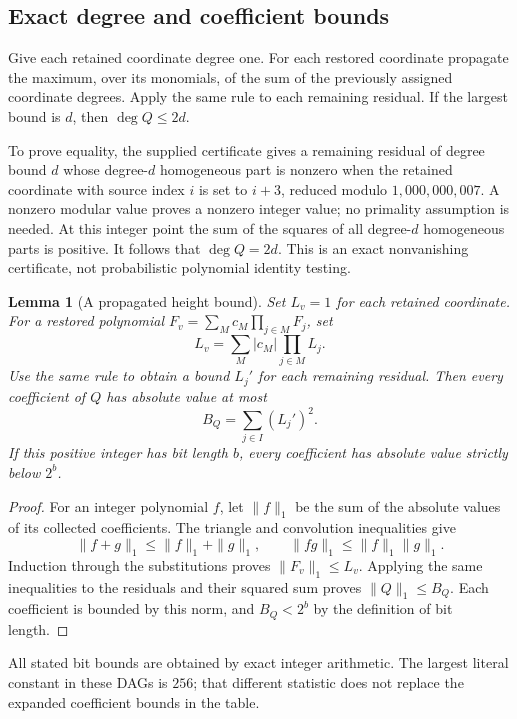\documentclass[11pt,letterpaper]{article}
\newtheorem{lemma}[theorem]{Lemma}
\theoremstyle{definition}
\theoremstyle{remark}
\begin{document}
\subsection{Exact degree and coefficient bounds}

Give each retained coordinate degree one.  For each restored coordinate
propagate the maximum, over its monomials, of the sum of the previously
assigned coordinate degrees.  Apply the same rule to each remaining
residual.  If the largest bound is $d$, then $\deg Q\le2d$.

To prove equality, the supplied certificate gives a remaining residual
of degree bound $d$ whose degree-$d$ homogeneous part is nonzero when
the retained coordinate with source index $i$ is set to $i+3$, reduced
modulo $1{,}000{,}000{,}007$.  A nonzero modular value proves a nonzero
integer value; no primality assumption is needed.  At this integer point
the sum of the squares of all degree-$d$ homogeneous parts is positive.
It follows that $\deg Q=2d$.  This is an exact nonvanishing certificate,
not probabilistic polynomial identity testing.

\begin{lemma}[A propagated height bound]
\label{lem:monic-height}
Set $L_v=1$ for each retained coordinate.  For a restored polynomial
$F_v=\sum_M c_M\prod_{j\in M}F_j$, set
\[
 L_v=\sum_M |c_M|\prod_{j\in M}L_j.
\]
Use the same rule to obtain a bound $L_j'$ for each remaining residual.
Then every coefficient of $Q$ has absolute value at most
\[
 B_Q=\sum_{j\in I}(L_j')^2.
\]
If this positive integer has bit length $b$, every coefficient has
absolute value strictly below $2^b$.
\end{lemma}

\begin{proof}
For an integer polynomial $f$, let $\|f\|_1$ be the sum of the absolute
values of its collected coefficients.  The triangle and convolution
inequalities give
\[
 \|f+g\|_1\le\|f\|_1+\|g\|_1,
 \qquad \|fg\|_1\le\|f\|_1\|g\|_1.
\]
Induction through the substitutions proves $\|F_v\|_1\le L_v$.
Applying the same inequalities to the residuals and their squared sum
proves $\|Q\|_1\le B_Q$.  Each coefficient is bounded by this norm,
and $B_Q<2^b$ by the definition of bit length.
\end{proof}

All stated bit bounds are obtained by exact integer arithmetic.  The
largest literal constant in these DAGs is $256$; that different statistic
does not replace the expanded coefficient bounds in the table.
\end{document}
